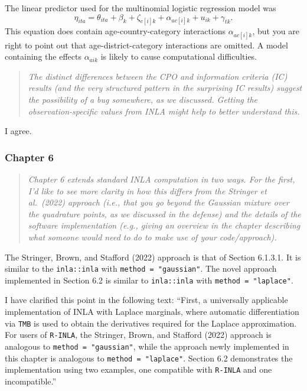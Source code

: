 \documentclass[
  12pt,
]{article}
\begin{document}
The linear predictor used for the multinomial logistic regression model
was \[
\eta_{ita} = \theta_{ita} + \beta_k + \zeta_{c[i]k} + \alpha_{ac[i]k} + u_{ik} + \gamma_{tk}.
\] This equation does contain age-country-category interactions
\(\alpha_{ac[i]k}\), but you are right to point out that
age-district-category interactions are omitted. A model containing the
effects \(\alpha_{aik}\) is likely to cause computational difficulties.

\begin{quote}
\emph{The distinct differences between the CPO and information criteria
(IC) results (and the very structured pattern in the surprising IC
results) suggest the possibility of a bug somewhere, as we discussed.
Getting the observation-specific values from INLA might help to better
understand this.}
\end{quote}

I agree.

\subsubsection{Chapter 6}\label{chapter-6}

\begin{quote}
\emph{Chapter 6 extends standard INLA computation in two ways. For the
first, I'd like to see more clarity in how this differs from the
Stringer et al.~(2022) approach (i.e., that you go beyond the Gaussian
mixture over the quadrature points, as we discussed in the defense) and
the details of the software implementation (e.g., giving an overview in
the chapter describing what someone would need to do to make use of your
code/approach).}
\end{quote}

The Stringer, Brown, and Stafford (2022) approach is that of Section
6.1.3.1. It is similar to the \texttt{inla::inla} with
\texttt{method\ =\ "gaussian"}. The novel approach implemented in
Section 6.2 is similar to \texttt{inla::inla} with
\texttt{method\ =\ "laplace"}.

I have clarified this point in the following text: ``First, a
universally applicable implementation of INLA with Laplace marginals,
where automatic differentiation via \texttt{TMB} is used to obtain the
derivatives required for the Laplace approximation. For users of
\texttt{R-INLA}, the Stringer, Brown, and Stafford (2022) approach is
analogous to \texttt{method\ =\ "gaussian"}, while the approach newly
implemented in this chapter is analogous to
\texttt{method\ =\ "laplace"}. Section 6.2 demonstrates the
implementation using two examples, one compatible with \texttt{R-INLA}
and one incompatible.''
\end{document}
